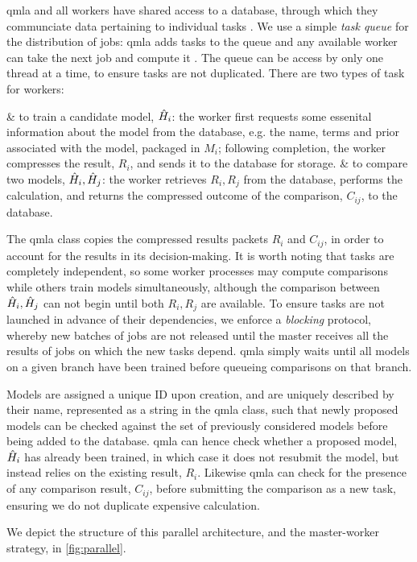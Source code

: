 \par 
\gls{qmla} and all workers have shared access to a database, through which they communciate data pertaining to individual tasks \cite{redis}. 
We use a simple \emph{task queue} for the distribution of jobs: 
    \gls{qmla} adds tasks to the queue and any available worker can take the next job and compute it \cite{redis_queue}.
The queue can be access by only one thread at a time, to ensure tasks are not duplicated. 
There are two types of task for workers:
\begin{easylist}
    & to train a candidate model, $\hat{H}_i$:
        the worker first requests some essenital information about the model from the database, 
        e.g. the name, terms and prior associated with the model, packaged in $M_i$;
        following completion, the worker compresses the result, $R_i$, and sends it to the database for storage. 
    & to compare two models, $\hat{H}_i, \hat{H}_j$: 
        the worker retrieves $R_i, R_j$ from the database, performs the calculation, 
        and returns the compressed outcome of the comparison, $C_{ij}$, to the database. 
\end{easylist}
The \gls{qmla} class copies the compressed results packets $R_i$ and $C_{ij}$,
    in order to account for the results in its decision-making. 
It is worth noting that tasks are completely independent, so some worker processes
    may compute comparisons while others train models simultaneously, 
    although the comparison between $\hat{H}_i, \hat{H}_j$ can not begin until both $R_i, R_j$ are available. 
To ensure tasks are not launched in advance of their dependencies, we enforce a \emph{blocking} protocol, 
    whereby new batches of jobs are not released until the master receives all the results of jobs on which the new tasks depend.
\gls{qmla} simply waits until all models on a given branch have been trained before queueing comparisons 
    on that branch.
\par

Models are assigned a unique ID upon creation,
    and are uniquely described by their name, represented as a string in the \gls{qmla} class, 
    such that newly proposed models can be checked against the set of previously considered models 
    before being added to the database. 
\gls{qmla} can hence check whether a proposed model, $\hat{H}_i$ has already been trained, 
    in which case it does not resubmit the model, but instead relies on the existing result, $R_i$. 
Likewise \gls{qmla} can check for the presence of any comparison result, $C_{ij}$, 
    before submitting the comparison as a new task, 
    ensuring we do not duplicate expensive calculation. 
\par 
We depict the structure of this parallel architecture, and the master-worker strategy, in \cref{fig:parallel}.

